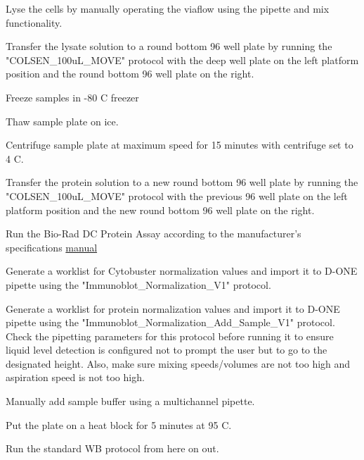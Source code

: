 \documentclass{protocols}
\begin{document}
\begin{procedure}
\begin{days}[Day 2]
			\item Lyse the cells by manually operating the viaflow using the pipette and mix functionality.
			\item Transfer the lysate solution to a round bottom 96 well plate by running the "COLSEN\_100uL\_MOVE" protocol with the deep well plate on the left platform position and the round bottom 96 well plate on the right.
			\item Freeze samples in -80 C freezer
		\end{days}
		\begin{days}[Day 3]
			\item Thaw sample plate on ice.
			\item Centrifuge sample plate at maximum speed for 15 minutes with centrifuge set to 4 C.
			\item Transfer the protein solution to a new round bottom 96 well plate by running the "COLSEN\_100uL\_MOVE" protocol with the previous 96 well plate on the left platform position and the new round bottom 96 well plate on the right.
			\item Run the Bio-Rad DC Protein Assay according to the manufacturer's specifications \hyperlink{https://www.bio-rad.com/webroot/web/pdf/lsr/literature/LIT448.pdf}{manual}
			\item Generate a worklist for Cytobuster normalization values and import it to D-ONE pipette using the "Immunoblot\_Normalization\_V1" protocol.
			\item Generate a worklist for protein normalization values and import it to D-ONE pipette using the "Immunoblot\_Normalization\_Add\_Sample\_V1" protocol. Check the pipetting parameters for this protocol before running it to ensure liquid level detection is configured not to prompt the user but to go to the designated height. Also, make sure mixing speeds/volumes are not too high and aspiration speed is not too high.
			\item Manually add sample buffer using a multichannel pipette.
			\item Put the plate on a heat block for 5 minutes at 95 C.
			\item Run the standard WB protocol from here on out.
			
		\end{days}
	\end{procedure}
	
	
	
	
\end{document}
